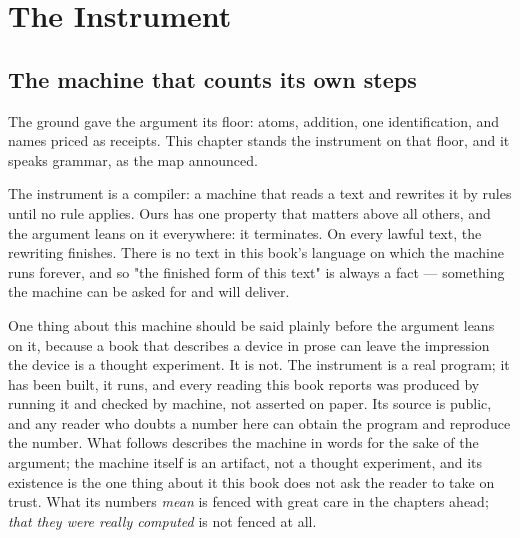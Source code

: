 \chapter{The Instrument}

\section{The machine that counts its own steps}

The ground gave the argument its floor: atoms, addition, one identification, and names
priced as receipts. This chapter stands the instrument on that floor, and it speaks
grammar, as the map announced.

The instrument is a compiler: a machine that reads a text and rewrites it by rules
until no rule applies. Ours has one property that matters above all others, and the
argument leans on it everywhere: it terminates. On every lawful text, the rewriting
finishes. There is no text in this book's language on which the machine runs forever,
and so "the finished form of this text" is always a fact --- something the machine can
be asked for and will deliver.

One thing about this machine should be said plainly before the argument leans on it,
because a book that describes a device in prose can leave the impression the device
is a thought experiment. It is not. The instrument is a real program; it has been
built, it runs, and every reading this book reports was produced by running it and
checked by machine, not asserted on paper. Its source is public, and any reader who
doubts a number here can obtain the program and reproduce the number. What follows
describes the machine in words for the sake of the argument; the machine itself is
an artifact, not a thought experiment, and its existence is the one thing about it
this book does not ask the reader to take on trust. What its numbers \emph{mean} is
fenced with great care in the chapters ahead; \emph{that they were really computed}
is not fenced at all.

